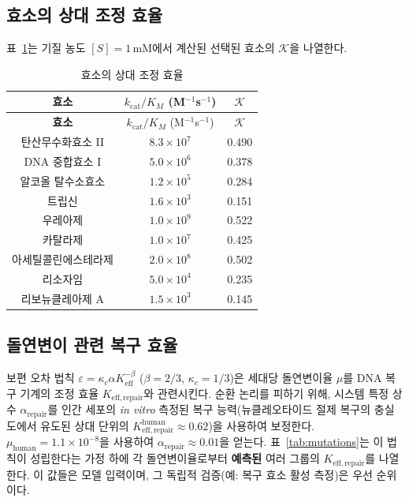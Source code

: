 \documentclass[12pt,a4paper]{article}
\newcommand{\REL}{\mathcal{K}}          %
\begin{document}
	\subsection{효소의 상대 조정 효율}
	\label{sec:enzymes}
	표~\ref{tab:enzymes}는 기질 농도 \([S]=1\,\text{mM}\)에서 계산된 선택된 효소의 \(\REL\)을 나열한다.
	
	\begin{longtable}{|c|c|c|}
		\caption{효소의 상대 조정 효율}\label{tab:enzymes}\\
		\hline
		\textbf{효소} & \(k_{\mathrm{cat}}/K_M\) (M\(^{-1}\)s\(^{-1}\)) & \(\REL\) \\
		\hline
		\endfirsthead
		\hline
		\textbf{효소} & \(k_{\mathrm{cat}}/K_M\) (M\(^{-1}\)s\(^{-1}\)) & \(\REL\) \\
		\hline
		\endhead
		\hline
		탄산무수화효소 II & \(8.3\times10^7\) & 0.490 \\
		DNA 중합효소 I & \(5.0\times10^6\) & 0.378 \\
		알코올 탈수소효소 & \(1.2\times10^5\) & 0.284 \\
		트립신 & \(1.6\times10^3\) & 0.151 \\
		우레아제 & \(1.0\times10^9\) & 0.522 \\
		카탈라제 & \(1.0\times10^7\) & 0.425 \\
		아세틸콜린에스테라제 & \(2.0\times10^8\) & 0.502 \\
		리소자임 & \(5.0\times10^4\) & 0.235 \\
		리보뉴클레아제 A & \(1.5\times10^3\) & 0.145 \\
		\hline
	\end{longtable}
	
	\subsection{돌연변이 관련 복구 효율}
	\label{sec:mutations}
	보편 오차 법칙 \(\varepsilon = \kappa_c \alpha K_{\mathrm{eff}}^{-\beta}\) (\(\beta=2/3\), \(\kappa_c=1/3\))은 세대당 돌연변이율 \(\mu\)를 DNA 복구 기계의 조정 효율 \(K_{\mathrm{eff,repair}}\)와 관련시킨다. 순환 논리를 피하기 위해, 시스템 특정 상수 \(\alpha_{\mathrm{repair}}\)를 인간 세포의 \textit{in vitro} 측정된 복구 능력(뉴클레오타이드 절제 복구의 충실도에서 유도된 상대 단위의 \(K_{\mathrm{eff,repair}}^{\mathrm{human}} \approx 0.62\))을 사용하여 보정한다. \(\mu_{\mathrm{human}}=1.1\times10^{-8}\)을 사용하여 \(\alpha_{\mathrm{repair}} \approx 0.01\)을 얻는다. 표~\ref{tab:mutations}는 이 법칙이 성립한다는 가정 하에 각 돌연변이율로부터 \textbf{예측된} 여러 그룹의 \(K_{\mathrm{eff,repair}}\)를 나열한다. 이 값들은 모델 입력이며, 그 독립적 검증(예: 복구 효소 활성 측정)은 우선 순위이다.
	
\end{document}
